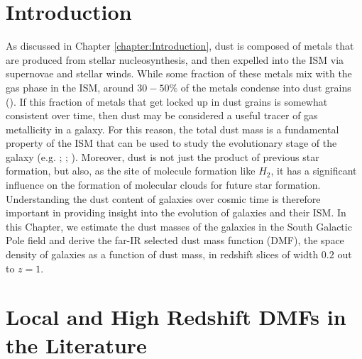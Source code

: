 \sloppy

\section{Introduction}

As discussed in Chapter \ref{chapter:Introduction}, dust is composed of metals that are produced from stellar nucleosynthesis, and then expelled into the ISM via supernovae and stellar winds. While some fraction of these metals mix with the gas phase in the ISM, around $30 - 50\%$ of the metals condense into dust grains (\citealt{Draine_2007b}). If this fraction of metals that get locked up in dust grains is somewhat consistent over time, then dust may be considered a useful tracer of gas metallicity in a galaxy. For this reason, the total dust mass is a fundamental property of the ISM that can be used to study the evolutionary stage of the galaxy (e.g. \citealt{Cortese_2012}; \citealt{deVis_2017a}; \citealt{deVis_2017b}). Moreover, dust is not just the product of previous star formation, but also, as the site of molecule formation like $H_2$, it has a significant influence on the formation of molecular clouds for future star formation. Understanding the dust content of galaxies over cosmic time is therefore important in providing insight into the evolution of galaxies and their ISM. In this Chapter, we estimate the dust masses of the galaxies in the South Galactic Pole field and derive the far-IR selected dust mass function (DMF), the space density of galaxies as a function of dust mass, in redshift slices of width $0.2$ out to $z = 1$.

\section{Local and High Redshift DMFs in the Literature}

